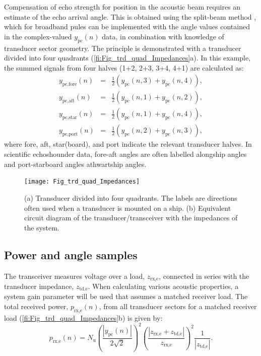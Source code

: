 \documentclass[preprint,12pt,TurnOnLineNumbers]{JASAnew}
\newcommand{\samplesymt}{n}
\newcommand{\nchannels}{N_{\textrm{u}}}
\newcommand{\zrxe}{z_{\textrm{rx,e}}}
\newcommand{\ztde}{z_{\textrm{td,e}}}
\newcommand{\prxe}{p_{\textrm{rx,e}}}
\newcommand{\ypc}{y_{\textrm{pc}}}
\begin{document}
Compensation of echo strength for position in the acoustic beam requires an estimate of the echo arrival angle. This is obtained using the split-beam method \citep{burdic1991}, which for broadband pules can be implemented with the angle values contained in the complex-valued $\ypc(\samplesymt)$ data, in combination with knowledge of transducer sector geometry. The principle is demonstrated with a transducer divided into four quadrants (\autoref{fi:Fig_trd_quad_Impedances}a). In this example, the summed signals from four halves (1+2, 2+3, 3+4, 4+1) are calculated as:
\begin{eqnarray}
\label{eq:SumHalves}
y_{\textrm{pc,fore}}(\samplesymt) & = & \frac{1}{2} \left( \ypc(\samplesymt,3)+\ypc(\samplesymt,4) \right),\\
y_{\textrm{pc,aft}}(\samplesymt) & = & \frac{1}{2} \left( \ypc(\samplesymt,1)+\ypc(\samplesymt,2) \right),\\
y_{\textrm{pc,star}}(\samplesymt) & = & \frac{1}{2} \left( \ypc(\samplesymt,1)+\ypc(\samplesymt,4) \right),\\
y_{\textrm{pc,port}}(\samplesymt) & = & \frac{1}{2} \left( \ypc(\samplesymt,2)+\ypc(\samplesymt,3) \right),
\end{eqnarray}
%
where fore, aft, star(board), and port indicate the relevant transducer halves. In scientific echoshounder data, fore-aft angles are often labelled  alongship angles and  port-starboard angles athwartship angles.

\begin{figure}
\texttt{[image: Fig\_trd\_quad\_Impedances]}
\caption{\label{fi:Fig_trd_quad_Impedances}(a) Transducer divided into four quadrants. The labels are directions often used when a transducer is mounted on a ship. (b) Equivalent circuit diagram of the transducer/transceiver with the impedances of the system.}
\end{figure}
%

\subsection{Power and angle samples}
The transceiver measures voltage over a load, $\zrxe$, connected in series with the transducer impedance, $\ztde$. When calculating various acoustic properties, a system gain parameter will be used that assumes a matched receiver load. The total received power, $\prxe(\samplesymt)$, from all transducer sectors for a matched receiver load (\autoref{fi:Fig_trd_quad_Impedances}b) is given by: 
\begin{equation}
\label{eq:prx}
\prxe(\samplesymt) = \nchannels\left( \frac{|\ypc(\samplesymt)|}{2\sqrt{2}} \right)^2 \left( \frac{|\zrxe+\ztde|}{\zrxe} \right)^2 \frac{1}{|\ztde|}.
\end{equation}
%
\end{document}
